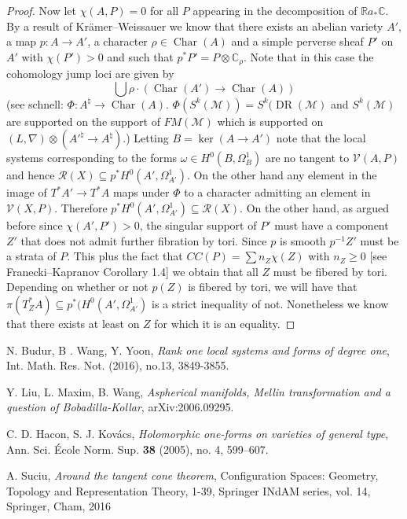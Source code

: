 \documentclass[a4paper,12pt,reqno]{amsart}
\theoremstyle{plain}
\theoremstyle{definition}
\theoremstyle{remark}
\DeclareMathOperator{\Char}{Char}
\newcommand{\sM}{\mathcal{M}}
\newcommand{\sR}{\mathcal{R}}
\newcommand\sV{{\mathcal V}}
\newcommand{\bbC}{\mathbb{C}}
\newcommand{\bbR}{\mathbb{R}}
\DeclareMathOperator{\DR}{DR}
\begin{document}
\begin{proof}
Now let $\chi(A, P) = 0$ for all $P$ appearing in the decomposition of $\bbR a_*\bbC$. By a result of Kr\"amer--Weissauer we know that there exists an abelian variety $A'$, a map $p\colon A\to A'$,
a character $\rho\in \Char(A)$ and a simple perverse sheaf $P'$ on
$A'$ with $\chi(P')>0$ and such that $p^*P'  = P\otimes \bbC_{\rho}$. Note that in this case the cohomology jump loci are given by
\[\bigcup \rho\cdot(\Char(A')\to \Char(A))\]
(see schnell: $\Phi : A^{\natural} \to \Char(A)$. $\Phi(S^k(\sM)) = S^k(\DR(\sM)$ and $S^k(\sM)$ are supported on the support of $FM(\sM)$ which 
is supported on $(L,\nabla)\otimes(A'^{\natural}\to A^{\natural})$.)
Letting $B = \ker(A\to A')$ note that the local systems corresponding to the forms $\omega\in H^0(B, \Omega_B^1)$ are no tangent to $\sV(A, P)$ and hence 
$\sR(X)\subseteq p^*H^0(A', \Omega_{A'}^1)$. On the other hand any element in the image of $T^*A' \to T^*A$
maps under $\Phi$ to a character admitting an element in $\sV(X, P)$. Therefore $p^*H^0(A', \Omega_{A'}^1)\subseteq \sR(X)$. 
On the other hand, as argued before since $\chi(A',P')>0$, the singular support of $P'$ must have a component $Z'$ that does not admit further fibration by tori.
Since $p$ is smooth $p^{-1}Z'$ must be a strata of $P$. This plus the fact that $CC(P) = \sum n_{Z}\chi(Z)$ with $n_Z\geq 0$ [see Franecki--Kapranov Corollary 1.4]
we obtain that all $Z$ must be fibered by tori. Depending on whether or not $p(Z)$ is fibered by tori, we will have that $\pi(T^*_ZA) \subseteq p^*(H^0(A',\Omega_{A'}^1)$ is a strict inequality of not. Nonetheless we know that there exists at least on $Z$ for which it is an equality.


\end{proof}




\begin{thebibliography}{ADMSP}



 N. Budur, B . Wang, Y. Yoon, {\it Rank one local systems and forms of degree one}, Int. Math. Res. Not. (2016), no.13, 3849-3855.


 Y. Liu, L. Maxim, B. Wang, \textit{Aspherical manifolds, Mellin transformation and a question of Bobadilla-Kollar}, arXiv:2006.09295.

 C. D. Hacon, S. J. Kov\'acs, \textit{Holomorphic one-forms on varieties of general type}, Ann. Sci. \'Ecole Norm. Sup. \textbf{38} (2005), no. 4, 599--607.


 A. Suciu, {\it Around the tangent cone theorem}, Configuration Spaces: Geometry, Topology and Representation Theory, 1-39, Springer INdAM series, vol. 14, Springer, Cham, 2016




\end{thebibliography}



\end{document}
